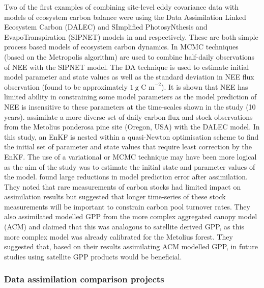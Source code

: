 Two of the first examples of combining site-level eddy covariance data with models of ecosystem carbon balance were using the Data Assimilation Linked Ecosystem Carbon (DALEC) and SImplified PhotosyNthesis and EvapoTranspiration (SIPNET) models in \citet{williams2005improved} and \citet{braswell2005estimating} respectively. These are both simple process based models of ecosystem carbon dynamics. In \citet{braswell2005estimating} MCMC techniques (based on the Metropolis algorithm) are used to combine half-daily observations of NEE with the SIPNET model. The DA technique is used to estimate initial model parameter and state values as well as the standard deviation in NEE flux observation (found to be approximately \(1~\text{g C m}^{-2}\)). It is shown that NEE has limited ability in constraining some model parameters as the model prediction of NEE is insensitive to these parameters at the time-scales shown in the study (10 years). \citet{williams2005improved} assimilate a more diverse set of daily carbon flux and stock observations from the Metolius ponderosa pine site (Oregon, USA) with the DALEC model. In this study, an EnKF is nested within a quasi-Newton optimisation scheme to find the initial set of parameter and state values that require least correction by the EnKF. The use of a variational or MCMC technique may have been more logical as the aim of the study was to estimate the initial state and parameter values of the model. \citet{williams2005improved} found large reductions in model prediction error after assimilation. They noted that rare measurements of carbon stocks had limited impact on assimilation results but suggested that longer time-series of these stock measurements will be important to constrain carbon pool turnover rates. They also assimilated modelled GPP from the more complex aggregated canopy model (ACM) \citep{williams1997predicting} and claimed that this was analogous to satellite derived GPP, as this more complex model was already calibrated for the Metolius forest. They suggested that, based on their results assimilating ACM modelled GPP, in future studies using satellite GPP products would be beneficial.  

\subsubsection{Data assimilation comparison projects} 

